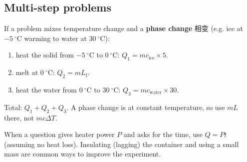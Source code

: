 \documentclass[11pt]{article}
\begin{document}
\subsection*{Multi-step problems}

If a problem mixes temperature change and a \textbf{phase change} 相变 (e.g. ice at $-5\ ^{\circ}\text{C}$ warming to water at $30\ ^{\circ}\text{C}$):

\begin{enumerate}
\item heat the solid from $-5\ ^{\circ}\text{C}$ to $0\ ^{\circ}\text{C}$: $Q_{1} = m c_{\text{ice}} \times 5$.

\item melt at $0\ ^{\circ}\text{C}$: $Q_{2} = m L_{\text{f}}$.

\item heat the water from $0\ ^{\circ}\text{C}$ to $30\ ^{\circ}\text{C}$: $Q_{3} = m c_{\text{water}} \times 30$.

\end{enumerate}

Total: $Q_{1} + Q_{2} + Q_{3}$. A phase change is at constant temperature, so use $mL$ there, not $mc\Delta T$.

When a question gives heater power $P$ and asks for the time, use $Q = Pt$ (assuming no heat loss). Insulating (lagging) the container and using a small mass are common ways to improve the experiment.
\end{document}
